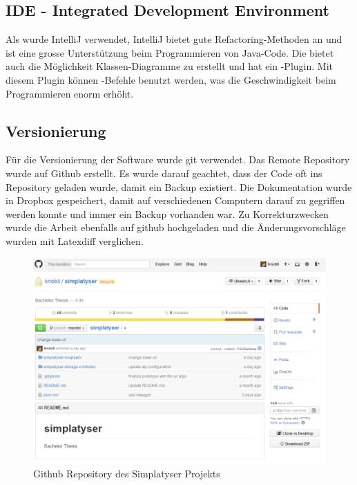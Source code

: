 \subsection{IDE - Integrated Development Environment}
Als  wurde IntelliJ verwendet, IntelliJ bietet gute Refactoring-Methoden an und ist eine grosse Unterstützung beim Programmieren von Java-Code. Die  
bietet auch die Möglichkeit Klassen-Diagramme zu erstellt und hat ein -Plugin. Mit diesem Plugin können -Befehle benutzt werden, was die 
Geschwindigkeit beim Programmieren enorm erhöht.


\subsection{Versionierung}
Für die Versionierung der Software wurde git \cite{git} verwendet. Das Remote Repository wurde auf Github \cite{github_simplatyzer} erstellt. Es wurde darauf geachtet, dass 
der Code oft ins Repository geladen wurde, damit ein Backup existiert. Die Dokumentation wurde in Dropbox gespeichert, damit auf verschiedenen Computern darauf zu gegriffen werden konnte 
und immer ein Backup vorhanden war. Zu Korrekturzwecken wurde die Arbeit ebenfalls auf github hochgeladen und die Änderungsvorschläge wurden mit Latexdiff verglichen.

\begin{figure}[h]
\centering
\includegraphics[scale=0.5]{images/github.png}
\caption[Github Repository des Simplatyser Projekts]{Github Repository des Simplatyser Projekts \selfmade{}}
\label{fig:github_repo}
\end{figure}

